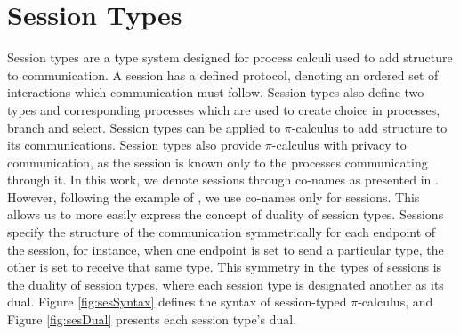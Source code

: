 \documentclass{l4proj}
\begin{document}
\section{Session Types}
\label{bgSesTypes}

\quad Session types are a type system designed for process calculi used to add structure to communication. A session has a defined protocol, denoting an ordered set of interactions which communication must follow. \citep{HondaLangPrim} Session types also define two types and corresponding processes which are used to create choice in processes, branch and select. Session types can be applied to $\pi$-calculus to add structure to its communications. Session types also provide $\pi$-calculus with privacy to communication, as the session is known only to the processes communicating through it. In this work, we denote sessions through co-names as presented in \citet{VASCONCELOS201252}. However, following the example of \citet{DARDHA2017253}, we use co-names only for sessions. This allows us to more easily express the concept of duality of session types. Sessions specify the structure of the communication symmetrically for each endpoint of the session, for instance, when one endpoint is set to send a particular type, the other is set to receive that same type. This symmetry in the types of sessions is the duality of session types, where each session type is designated another as its dual. Figure \ref{fig:sesSyntax} defines the syntax of session-typed $\pi$-calculus, and Figure \ref{fig:sesDual} presents each session type's dual.
\end{document}
